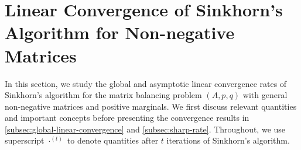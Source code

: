 \section{Linear Convergence of Sinkhorn's Algorithm for Non-negative Matrices}
\label{sec:linear-convergence}
In this section, we study the global and asymptotic linear convergence rates of Sinkhorn's algorithm for the matrix balancing problem $(A,p,q)$ with general non-negative matrices and positive marginals. We first discuss relevant quantities and important concepts before presenting the convergence results in \cref{subsec:global-linear-convergence} and \cref{subsec:sharp-rate}.
Throughout, we use superscript $\cdot^{(t)}$ to denote quantities after $t$ iterations of Sinkhorn's algorithm. %

